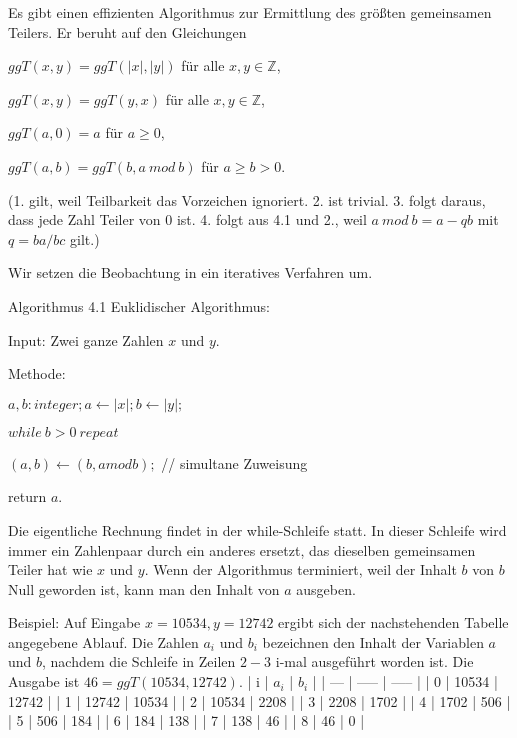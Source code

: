 \documentclass[a4paper]{article}
\begin{document}
\begin{multicols}{3}
    Es gibt einen effizienten Algorithmus zur Ermittlung des größten gemeinsamen Teilers. Er beruht auf den Gleichungen
    \begin{enumerate*}
        \item $ggT(x,y) = ggT(|x|,|y|)$ für alle $x,y\in\mathbb{Z}$,
        \item  $ggT(x,y) = ggT(y,x)$ für alle $x,y\in\mathbb{Z}$,
        \item  $ggT(a,0) =a$ für $a\geq 0$,
        \item  $ggT(a,b) = ggT(b,a\ mod\ b)$ für $a\geq b >0$.
    \end{enumerate*}

    (1. gilt, weil Teilbarkeit das Vorzeichen ignoriert. 2. ist trivial. 3. folgt daraus, dass jede Zahl Teiler von $0$ ist. 4. folgt aus 4.1 und 2., weil $a\ mod\ b=a-qb$ mit $q=ba/bc$ gilt.)

    Wir setzen die Beobachtung in ein iteratives Verfahren um.

    Algorithmus 4.1 Euklidischer Algorithmus:
    \begin{itemize*}
        \item Input: Zwei ganze Zahlen $x$ und $y$.
        \item Methode:
        \begin{enumerate*}
            \item $a,b:integer;a\leftarrow |x|;b\leftarrow |y|;$
            \item  $while\ b> 0\ repeat$
            \item  $(a,b)\leftarrow (b,amodb);$ // simultane Zuweisung
            \item  return $a$.
        \end{enumerate*}
    \end{itemize*}

    Die eigentliche Rechnung findet in der while-Schleife statt. In dieser Schleife wird immer ein Zahlenpaar durch ein anderes ersetzt, das dieselben gemeinsamen Teiler hat wie $x$ und $y$. Wenn der Algorithmus terminiert, weil der Inhalt $b$ von $b$ Null geworden ist, kann man den Inhalt von $a$ ausgeben.

    Beispiel: Auf Eingabe $x=10534, y=12742$ ergibt sich der nachstehenden Tabelle angegebene Ablauf. Die Zahlen $a_i$ und $b_i$ bezeichnen den Inhalt der Variablen $a$ und $b$, nachdem die Schleife in Zeilen $2-3$ i-mal ausgeführt worden ist. Die Ausgabe ist $46 = ggT(10534,12742)$.
    | i   | $a_i$ | $b_i$ |
    | --- | ----- | ----- |
    | 0   | 10534 | 12742 |
    | 1   | 12742 | 10534 |
    | 2   | 10534 | 2208  |
    | 3   | 2208  | 1702  |
    | 4   | 1702  | 506   |
    | 5   | 506   | 184   |
    | 6   | 184   | 138   |
    | 7   | 138   | 46    |
    | 8   | 46    | 0     |



\end{multicols}
\end{document}

